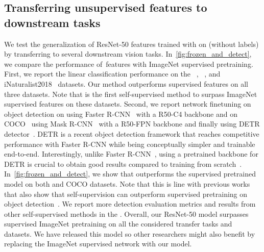 \subsection{Transferring unsupervised features to downstream tasks}
\label{sec:downstream}
We test the generalization of ResNet-50 features trained with \OURS on \ImNet (without labels) by transferring to several downstream vision tasks.
In~\cref{fig:frozen_and_detect}, we compare the performance of~\OURS features with ImageNet supervised pretraining.
First, we report the linear classification performance on the \Places~\cite{zhou2014learning}, \VOCseven~\cite{everingham2010pascal}, and iNaturalist2018~\cite{van2018inaturalist} datasets.
Our method outperforms supervised features on all three datasets.
Note that \OURS is the first self-supervised method to surpass ImageNet supervised features on these datasets.
Second, we report network finetuning on object detection on \VOCseventwelve using Faster R-CNN~\cite{ren2015faster} with a R50-C4 backbone and on COCO~\cite{lin2014microsoft} using Mask R-CNN~\cite{he2017mask} with a R50-FPN backbone and finally using DETR detector~\cite{carion2020end}.
DETR is a recent object detection framework that reaches competitive performance with Faster R-CNN while being conceptually simpler and trainable end-to-end.
Interestingly, unlike Faster R-CNN~\cite{ren2015faster}, using a pretrained backbone for DETR is crucial to obtain good results compared to training from scratch~\cite{carion2020end}.
In~\cref{fig:frozen_and_detect}, we show that \OURS outperforms the supervised pretrained model on both \VOCseventwelve and COCO datasets.
Note that this is line with previous works that also show that self-supervision can outperform supervised pretraining on object detection~\cite{misra2019self,he2019momentum,gidaris2020learning}.
We report more detection evaluation metrics and results from other self-supervised methods in the \appendixName.
Overall, our \OURS ResNet-50 model surpasses supervised ImageNet pretraining on all the considered transfer tasks and datasets.
We have released this model so other researchers might also benefit by replacing the ImageNet supervised network with our model.

